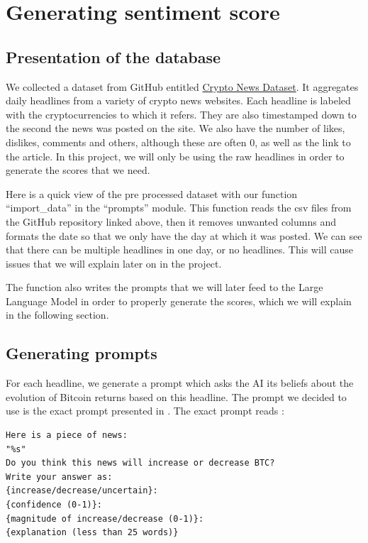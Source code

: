 \documentclass[
  a4paper]{article}
\begin{document}
\hypertarget{generating-sentiment-score}{%
\section{Generating sentiment score}\label{generating-sentiment-score}}

\hypertarget{presentation-of-the-database}{%
\subsection{Presentation of the
database}\label{presentation-of-the-database}}

We collected a dataset from GitHub entitled
\href{https://github.com/soheilrahsaz/cryptoNewsDataset}{Crypto News
Dataset}. It aggregates daily headlines from a variety of crypto news
websites. Each headline is labeled with the cryptocurrencies to which it
refers. They are also timestamped down to the second the news was posted
on the site. We also have the number of likes, dislikes, comments and
others, although these are often 0, as well as the link to the article.
In this project, we will only be using the raw headlines in order to
generate the scores that we need.

Here is a quick view of the pre processed dataset with our function
``import\_data'' in the ``prompts'' module. This function reads the csv
files from the GitHub repository linked above, then it removes unwanted
columns and formats the date so that we only have the day at which it
was posted. We can see that there can be multiple headlines in one day,
or no headlines. This will cause issues that we will explain later on in
the project.

The function also writes the prompts that we will later feed to the
Large Language Model in order to properly generate the scores, which we
will explain in the following section.

\hypertarget{generating-prompts}{%
\subsection{Generating prompts}\label{generating-prompts}}

For each headline, we generate a prompt which asks the AI its beliefs
about the evolution of Bitcoin returns based on this headline. The
prompt we decided to use is the exact prompt presented in
\textcite{leland_bybee_2025} . The exact prompt reads :

\begin{verbatim}
Here is a piece of news:
"%s"
Do you think this news will increase or decrease BTC?
Write your answer as: 
{increase/decrease/uncertain}:
{confidence (0-1)}:
{magnitude of increase/decrease (0-1)}:
{explanation (less than 25 words)}
\end{verbatim}
\end{document}
